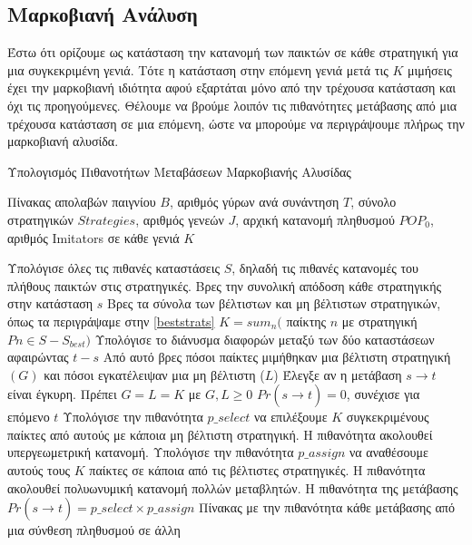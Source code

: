 \documentclass[12pt]{report}
\begin{document}
\subsection{Μαρκοβιανή Ανάλυση}
Έστω ότι ορίζουμε ως κατάσταση την κατανομή των παικτών σε κάθε στρατηγική για μια συγκεκριμένη γενιά. Τότε η κατάσταση στην επόμενη γενιά μετά τις $K$ μιμήσεις έχει την μαρκοβιανή ιδιότητα αφού εξαρτάται μόνο από την τρέχουσα κατάσταση και όχι τις προηγούμενες. Θέλουμε να βρούμε λοιπόν τις πιθανότητες μετάβασης από μια τρέχουσα κατάσταση σε μια επόμενη, ώστε να μπορούμε να περιγράψουμε πλήρως την μαρκοβιανή αλυσίδα.
\begin{algorithm}[H]
\caption{Υπολογισμός Πιθανοτήτων Μεταβάσεων Μαρκοβιανής Αλυσίδας}
\label{alg:StateTransProbs}
\begin{algorithmic}[1]
\REQUIRE Πίνακας απολαβών παιγνίου $B$, αριθμός γύρων ανά συνάντηση $T$, σύνολο στρατηγικών $Strategies$, αριθμός γενεών $J$, αρχική κατανομή πληθυσμού $POP_0$, αριθμός \foreignlanguage{english}{Imitators} σε κάθε γενιά $K$

\STATE Υπολόγισε όλες τις πιθανές καταστάσεις $S$, δηλαδή τις πιθανές κατανομές του πλήθους παικτών στις στρατηγικές.
\STATE Βρες την συνολική απόδοση κάθε στρατηγικής στην κατάσταση $s$
\STATE Βρες τα σύνολα των βέλτιστων και μη βέλτιστων στρατηγικών, όπως τα περιγράψαμε στην \ref{beststrats}
\STATE $K=sum_n($ παίκτης $n$ με στρατηγική $Pn \in S - S_{best})$
\ENDIF
{}
\STATE Υπολόγισε το διάνυσμα διαφορών μεταξύ των δύο καταστάσεων αφαιρώντας $t-s$
\STATE Από αυτό βρες πόσοι παίκτες μιμήθηκαν μια βέλτιστη στρατηγική $(G)$ και πόσοι εγκατέλειψαν μια μη βέλτιστη ($L$)
\STATE Έλεγξε αν η μετάβαση $s\xrightarrow{} t$ είναι έγκυρη. Πρέπει $G=L=K$ με $G, L \geq 0$
\STATE $Pr(s\xrightarrow[]{}t)=0$, συνέχισε για επόμενο $t$
\ELSE
\STATE Υπολόγισε την πιθανότητα $p\_select$ να επιλέξουμε $K$ συγκεκριμένους παίκτες από αυτούς με κάποια μη βέλτιστη στρατηγική. Η πιθανότητα ακολουθεί υπεργεωμετρική κατανομή.
\STATE Υπολόγισε την πιθανότητα $p\_assign$ να αναθέσουμε αυτούς τους $K$ παίκτες σε κάποια από τις βέλτιστες στρατηγικές. Η πιθανότητα ακολουθεί πολυωνυμική κατανομή πολλών μεταβλητών.
\STATE Η πιθανότητα της μετάβασης $Pr(s\xrightarrow[]{}t)=p\_select \times p\_assign$
\ENDIF
\ENDFOR
\ENDFOR
\ENSURE Πίνακας με την πιθανότητα κάθε μετάβασης από μια σύνθεση πληθυσμού σε άλλη
    \end{algorithmic}
\end{algorithm}
\end{document}
